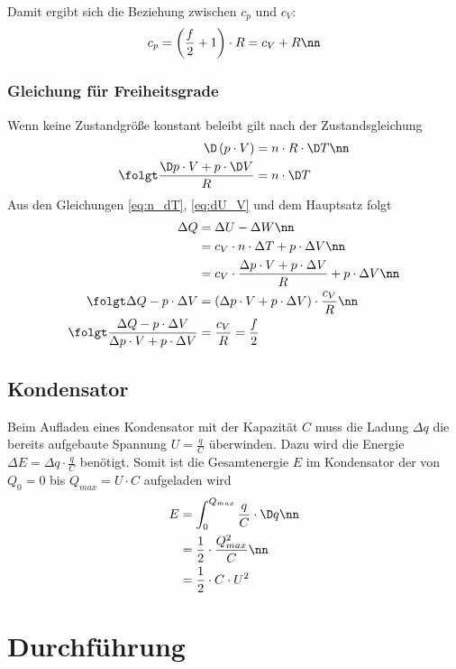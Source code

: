 \documentclass[12pt, a4paper, twoside]{scrartcl}
\begin{document}
Damit ergibt sich die Beziehung zwischen $c_p$ und $c_V$:
\begin{align}
 c_p = \left(\frac{f}{2}+1\right) \cdot R = c_V + R \nn
\end{align}

\subsubsection*{Gleichung für Freiheitsgrade}
Wenn keine Zustandgröße konstant beleibt gilt nach der Zustandsgleichung
\begin{align}
 \D \left(p\cdot V\right) &= n\cdot R\cdot \D T \nn\\
 \folgt \frac{\D p \cdot V + p \cdot \D V}{R} &= n \cdot \D T \label{eq:n_dT}
\end{align}
Aus den Gleichungen \eqref{eq:n_dT}, \eqref{eq:dU_V} und dem Hauptsatz folgt
\begin{align}
 \Delta Q &= \Delta U - \Delta W \nn\\
          &= c_V\cdot n\cdot \Delta T + p \cdot \Delta V \nn\\
          &= c_V \cdot \frac{\Delta p \cdot V + p \cdot \Delta V}{R} + p\cdot \Delta V \nn\\
 \folgt
 \Delta Q - p \cdot \Delta V &= \left(\Delta p \cdot V + p \cdot \Delta V\right)\cdot \frac{c_V}{R} \nn\\
 \folgt
 \frac{\Delta Q - p \cdot \Delta V}{\Delta p \cdot V + p \cdot \Delta V} &= \frac{c_V}{R} = \frac{f}{2}
\end{align}

\subsection{Kondensator}
Beim Aufladen eines Kondensator mit der Kapazität $C$ muss die Ladung $\Delta q$ die bereits aufgebaute Spannung $U = \frac{q}{C}$ überwinden. Dazu wird die Energie $\Delta E = \Delta q\cdot \frac{q}{C}$ benötigt.
Somit ist die Gesamtenergie $E$ im Kondensator der von $Q_0 = 0$ bis $Q_{max} = U \cdot C$ aufgeladen wird
\begin{align}
 E &= \int_{0}^{Q_{max}} \frac{q}{C}\cdot \D q \nn\\
   &= \frac{1}{2}\cdot\frac{Q_{max}^2}{C} \nn\\
   &= \frac{1}{2}\cdot C\cdot U^2
\end{align}



\section{Durchführung}
\label{sec:durchfuehrung}
\end{document}
